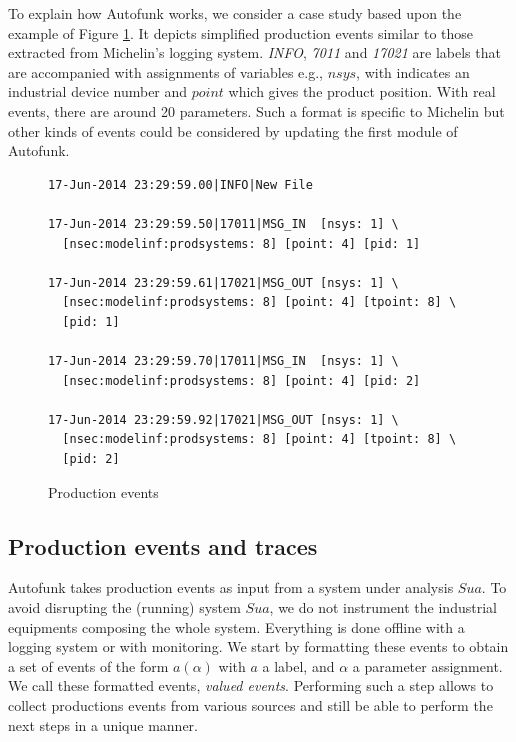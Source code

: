 To explain how Autofunk works, we consider a case study based
upon the example of Figure \ref{fig:rawdatum}. It depicts
simplified production events similar to those extracted from
Michelin's logging system. \textit{INFO}, \textit{7011} and
\textit{17021} are labels that are accompanied with assignments
of variables e.g., $nsys$, with indicates an industrial device
number and $point$ which gives the product position. With real
events, there are around 20 parameters. Such a format is specific
to Michelin but other kinds of events could be considered by
updating the first module of Autofunk.

\begin{figure}[ht]
\begin{framed}
\begin{BVerbatim}
17-Jun-2014 23:29:59.00|INFO|New File

17-Jun-2014 23:29:59.50|17011|MSG_IN  [nsys: 1] \
  [nsec:modelinf:prodsystems: 8] [point: 4] [pid: 1]

17-Jun-2014 23:29:59.61|17021|MSG_OUT [nsys: 1] \
  [nsec:modelinf:prodsystems: 8] [point: 4] [tpoint: 8] \
  [pid: 1]

17-Jun-2014 23:29:59.70|17011|MSG_IN  [nsys: 1] \
  [nsec:modelinf:prodsystems: 8] [point: 4] [pid: 2]

17-Jun-2014 23:29:59.92|17021|MSG_OUT [nsys: 1] \
  [nsec:modelinf:prodsystems: 8] [point: 4] [tpoint: 8] \
  [pid: 2]
\end{BVerbatim}
\end{framed}

\caption{Production events}
\label{fig:rawdatum}
\end{figure}

\subsection{Production events and traces}
\label{part3:collecting}

Autofunk takes production events as input from a system under
analysis $Sua$. To avoid disrupting the (running) system $Sua$,
we do not instrument the industrial equipments composing the
whole system. Everything is done offline with a logging system or
with monitoring. We start by formatting these events to obtain a
set of events of the form $a(\alpha)$ with $a$ a label, and
$\alpha$ a parameter assignment. We call these formatted events,
\textit{valued events}. Performing such a step allows to collect
productions events from various sources and still be able to
perform the next steps in a unique manner.

